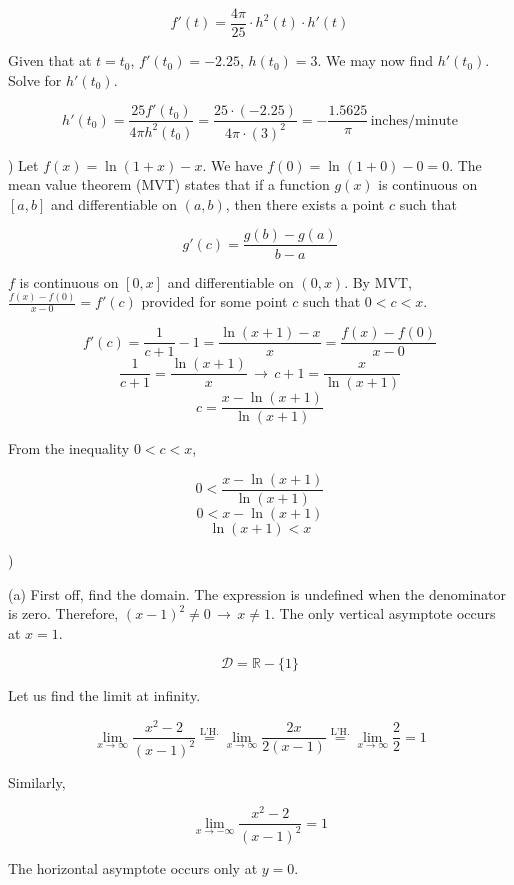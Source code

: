 \documentclass{article}
\begin{document}
\[f'(t)=\frac{4\pi}{25}\cdot h^2(t)\cdot h'(t)\]

\hfill

\noindent Given that at $t=t_0$, $f'(t_0) = -2.25,\,h(t_0) =3$. We may now find $h'(t_0)$. Solve for $h'(t_0)$.

\[h'(t_0)=\frac{25f'(t_0)}{4\pi h^2(t_0)}=\frac{25\cdot(-2.25)}{4\pi\cdot(3)^2}=\boxed{-\frac{1.5625}\pi\,\text{inches/minute}}\]

\hfill

) Let $f(x) = \ln(1+x)-x$. We have $f(0) = \ln(1 + 0) - 0 = 0$. The mean value theorem (MVT) states that if a function $g(x)$ is continuous on $[a, b]$ and differentiable on $(a,b)$, then there exists a point $c$ such that

\[
g'(c) = \frac{g(b)-g(a)}{b-a}
\]

\hfill

\noindent $f$ is continuous on $[0,x]$ and differentiable on $(0,x)$. By MVT, $\displaystyle\frac{f(x)-f(0)}{x-0}=f'(c)$ provided for some point $c$ such that $0<c<x$.

\[f'(c)=\frac1{c+1}-1=\frac{\ln(x+1) - x}x=\frac{f(x)-f(0)}{x-0}\]
\[\frac1{c+1}=\frac{\ln(x+1) }x\,\rightarrow\, c+1 = \frac x{\ln(x+1)}\]
\[c=\frac{x-\ln(x+1)}{\ln(x+1)}\]

\hfill

\noindent From the inequality $0<c<x$,

\[0<\frac{x-\ln(x+1)}{\ln(x+1)}\]
\[0<x-\ln(x+1)\]
\[\ln(x+1)<x\]

\hfill

)

\hfill

\noindent (a) First off, find the domain. The expression is undefined when the denominator is zero. Therefore, $(x-1)^2\neq0\,\rightarrow\,x\neq1$. The only vertical asymptote occurs at $x = 1$.

\[\mathcal{D} = \mathbb{R} - \{1\}\]

\hfill

\noindent Let us find the limit at infinity.

\[\lim_{x\to \infty}\frac{x^2-2}{(x-1)^2} \overset{\text{L'H.}}{=} \lim_{x\to \infty} \frac{2x}{2(x-1)} \overset{\text{L'H.}}{=} \lim_{x\to \infty} \frac{2}{2}=1\]

\noindent Similarly,

\[\lim_{x\to -\infty}\frac{x^2-2}{(x-1)^2}=1\]

\hfill

\noindent The horizontal asymptote occurs only at $y=0$.
\end{document}
